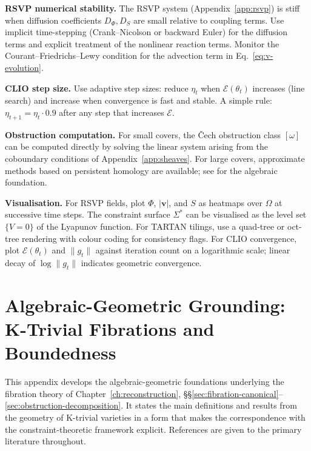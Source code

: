 \documentclass[11pt,openany]{book}
\begin{document}
\textbf{RSVP numerical stability.}  The RSVP system
(Appendix~\ref{app:rsvp}) is stiff when diffusion
coefficients $D_\Phi, D_S$ are small relative to coupling
terms.  Use implicit time-stepping (Crank--Nicolson or
backward Euler) for the diffusion terms and explicit
treatment of the nonlinear reaction terms.  Monitor the
Courant--Friedrichs--Lewy condition for the advection term
in Eq.~\eqref{eq:v-evolution}.

\textbf{CLIO step size.}  Use adaptive step sizes: reduce
$\eta_t$ when $\mathcal{E}(\theta_t)$ increases (line
search) and increase when convergence is fast and stable.
A simple rule: $\eta_{t+1} = \eta_t \cdot 0.9$ after any
step that increases $\mathcal{E}$.

\textbf{Obstruction computation.}  For small covers, the
Čech obstruction class $[\omega]$ can be computed directly
by solving the linear system arising from the coboundary
conditions of Appendix~\ref{app:sheaves}.  For large
covers, approximate methods based on persistent homology
are available; see \citet{bredon1997sheaf} for the
algebraic foundation.

\textbf{Visualisation.}  For RSVP fields, plot $\Phi$,
$|\boldsymbol{v}|$, and $S$ as heatmaps over $\Omega$ at
successive time steps.  The constraint surface $\Sigma^*$
can be visualised as the level set $\{V = 0\}$ of the
Lyapunov function.  For TARTAN tilings, use a quad-tree
or oct-tree rendering with colour coding for consistency
flags.  For CLIO convergence, plot $\mathcal{E}(\theta_t)$
and $\|g_t\|$ against iteration count on a logarithmic
scale; linear decay of $\log\|g_t\|$ indicates geometric
convergence.




\chapter[Algebraic-Geometric Grounding]{Algebraic-Geometric Grounding: K-Trivial Fibrations and Boundedness}
\label{app:algebraic-geometry}

This appendix develops the algebraic-geometric foundations
underlying the fibration theory of
Chapter~\ref{ch:reconstruction}, \S\S\ref{sec:fibration-canonical}--\ref{sec:obstruction-decomposition}.
It states the main definitions and results from the
geometry of K-trivial varieties in a form that makes the
correspondence with the constraint-theoretic framework
explicit.  References are given to the primary literature
throughout.
\end{document}
